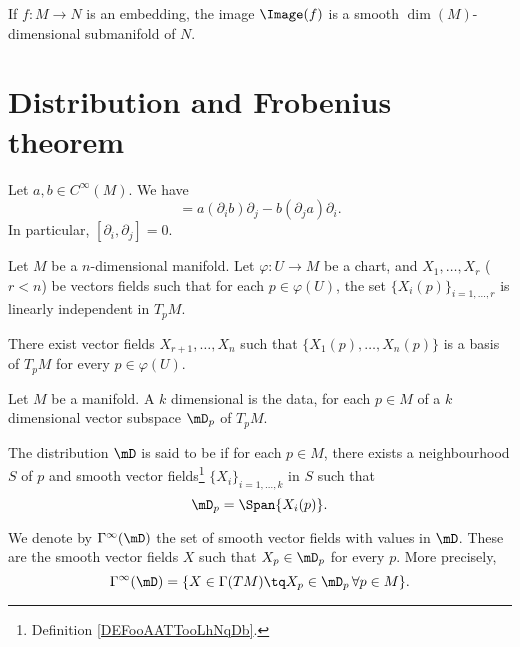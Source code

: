 \begin{proposition}     \label{PROPooYHOKooYASzRL}
    If \( f\colon M\to N\) is an embedding, the image \( \Image(f)\) is a smooth \( \dim(M)\)-dimensional submanifold of \( N\).
\end{proposition}


\section{Distribution and Frobenius theorem}

\begin{lemma}       \label{LEMooQXRSooHDRequ}
    Let \( a,b\in  C^{\infty}(M)\). We have
    \begin{equation}
        [a\partial_i,b\partial_j]=a(\partial_ib)\partial_j-b(\partial_ja)\partial_i.
    \end{equation}
    In particular, \( [\partial_i,\partial_j]=0\).
\end{lemma}

\begin{lemma}       \label{LEMooGHQZooMIWAfn}
    Let \( M\) be a \( n\)-dimensional manifold. Let \( \varphi\colon U\to M\) be a chart, and \( X_1,\ldots, X_r\) (\( r<n\)) be vectors fields such that for each \( p\in \varphi(U)\), the set \( \{ X_i(p) \}_{i=1,\ldots, r}\) is linearly independent in \( T_pM\). 

    There exist vector fields \( X_{r+1},\ldots,  X_n\) such that \( \{  X_1(p),\ldots, X_n(p) \}\) is a basis of \( T_pM\) for every \( p\in \varphi(U)\).
\end{lemma}

\begin{definition}      \label{DEFooYOMHooZJvsSt}
    Let \( M\) be a manifold. A \( k\) dimensional  is the data, for each \( p\in M\) of a \( k\) dimensional vector subspace \( \mD_p\) of \( T_pM\).

    The distribution \( \mD\) is said to be  if for each \( p\in M\), there exists a neighbourhood \( S\) of \( p\) and smooth vector fields\footnote{Definition \ref{DEFooAATTooLhNqDb}.} \( \{ X_i \}_{i=1,\ldots, k}\) in \( S\) such that
    \begin{equation}
        \mD_p=\Span\{ X_i(p) \}.
    \end{equation}

    We denote by \( \Gamma^{\infty}(\mD) \) the set of smooth vector fields with values in \( \mD\). These are the smooth vector fields \( X\) such that \( X_p\in \mD_p\) for every \( p\). More precisely,
    \begin{equation}
        \Gamma^{\infty}(\mD)=\{ X\in \Gamma(TM)\tq X_p\in\mD_p\,\forall p\in M \}.
    \end{equation}
\end{definition}

